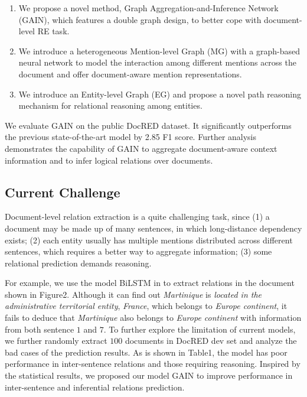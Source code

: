 \documentclass[bachelor]{thesis-uestc}
\begin{document}
\begin{enumerate}

    \item We propose a novel method, Graph Aggregation-and-Inference Network (GAIN), which features a double graph design, to better cope with document-level RE task.
    \item We introduce a heterogeneous Mention-level Graph (MG) with a graph-based neural network to model the interaction among different mentions across the document and offer document-aware mention representations.
    \item We introduce an Entity-level Graph (EG) and propose a novel path reasoning mechanism for relational reasoning among entities.
\end{enumerate}

We evaluate GAIN on the public DocRED dataset. It significantly outperforms the previous state-of-the-art model by 2.85 F1 score. Further analysis demonstrates the capability of GAIN to aggregate document-aware context information and to infer logical relations over documents.\par

\subsection{Current Challenge}

Document-level relation extraction is a quite challenging task, since (1) a document may be made up of many sentences, in which long-distance dependency exists; (2) each entity usually has multiple mentions distributed across different sentences, which requires a better way to aggregate information; (3) some relational prediction demands reasoning.\par

For example, we use the model BiLSTM in  to extract relations in the document shown in Figure2. Although it can find out \textit{Martinique} is \textit{located in the administrative territorial entity}, \textit{France}, which belongs to \textit{Europe continent}, it fails to deduce that \textit{Martinique} also belongs to \textit{Europe continent} with information from both sentence $1$ and $7$. To further explore the limitation of current models, we further randomly extract $100$ documents in DocRED dev set and analyze the bad cases of the prediction results. As is shown in Table1, the model has poor performance in inter-sentence relations and those requiring reasoning. Inspired by the statistical results, we proposed our model GAIN to improve performance in inter-sentence and inferential relations prediction.\par
\end{document}
